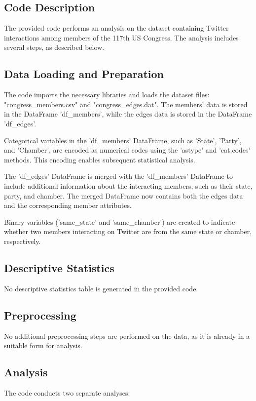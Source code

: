 \documentclass[11pt]{article}
\begin{document}
\subsection{Code Description}

The provided code performs an analysis on the dataset containing Twitter interactions among members of the 117th US Congress. The analysis includes several steps, as described below.

\subsection{Data Loading and Preparation}
The code imports the necessary libraries and loads the dataset files: "congress\_members.csv" and "congress\_edges.dat". The members' data is stored in the DataFrame 'df\_members', while the edges data is stored in the DataFrame 'df\_edges'.

Categorical variables in the 'df\_members' DataFrame, such as 'State', 'Party', and 'Chamber', are encoded as numerical codes using the 'astype' and 'cat.codes' methods. This encoding enables subsequent statistical analysis.

The 'df\_edges' DataFrame is merged with the 'df\_members' DataFrame to include additional information about the interacting members, such as their state, party, and chamber. The merged DataFrame now contains both the edges data and the corresponding member attributes.

Binary variables ('same\_state' and 'same\_chamber') are created to indicate whether two members interacting on Twitter are from the same state or chamber, respectively.

\subsection{Descriptive Statistics}
No descriptive statistics table is generated in the provided code.

\subsection{Preprocessing}
No additional preprocessing steps are performed on the data, as it is already in a suitable form for analysis.

\subsection{Analysis}
The code conducts two separate analyses:
\end{document}
